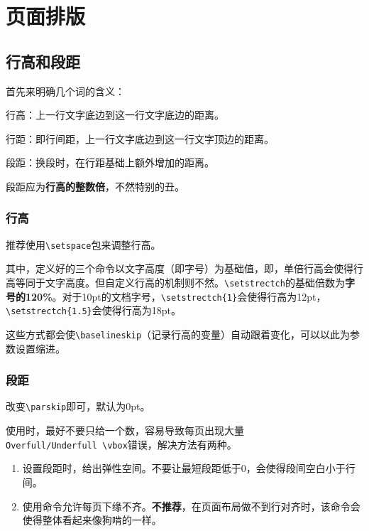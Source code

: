 \documentclass[10pt,openany]{book}
\newenvironment{tightenum}
{\begin{enumerate}[topsep=0pt,partopsep=0pt,itemsep=0pt,parsep=0pt,leftmargin=3\ccwd,labelwidth=1.5\ccwd,labelsep=.5\ccwd]}
        {\end{enumerate}}
\begin{document}


\chapter{页面排版}

\section{行高和段距}

首先来明确几个词的含义：

行高：上一行文字底边到这一行文字底边的距离。

行距：即行间距，上一行文字底边到这一行文字顶边的距离。

段距：换段时，在行距基础上额外增加的距离。

段距应为\textbf{行高的整数倍}，不然特别的丑。

\subsection{行高}

推荐使用\texttt{\textbackslash{}setspace}包来调整行高。



其中，定义好的三个命令以文字高度（即字号）为基础值，即，单倍行高会使得行高等同于文字高度。但自定义行高的机制则不然。\texttt{\textbackslash{}setstrectch}的基础倍数为\textbf{字号的120\%}。对于10pt的文档字号，\texttt{\textbackslash{}setstrectch\{1\}}会使得行高为12pt，\texttt{\textbackslash{}setstrectch\{1.5\}}会使得行高为18pt。

这些方式都会使\texttt{\textbackslash{}baselineskip}（记录行高的变量）自动跟着变化，可以以此为参数设置缩进。

\subsection{段距}

改变\texttt{\textbackslash{}parskip}即可，默认为0pt。



使用时，最好不要只给一个数，容易导致每页出现大量\texttt{Overfull/Underfull\ \textbackslash{}vbox}错误，解决方法有两种。

\begin{tightenum}
    \item   设置段距时，给出弹性空间。不要让最短段距低于0，会使得段间空白小于行间。
    \item   使用命令允许每页下缘不齐。\textbf{不推荐}，在页面布局做不到行对齐时，该命令会使得整体看起来像狗啃的一样。
\end{tightenum}
\end{document}
